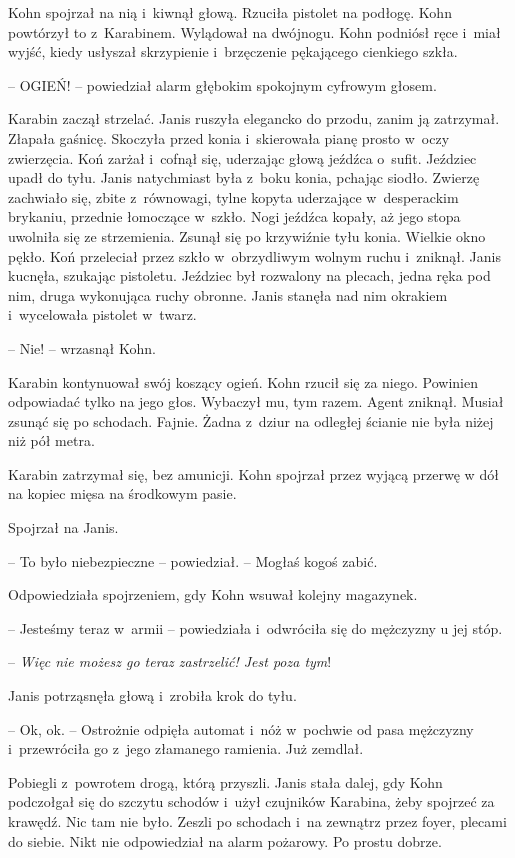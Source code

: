 \documentclass[oneside,polish,11pt,sfheadings]{mwbk}
\begin{document}
Kohn spojrzał na nią i~kiwnął głową. Rzuciła pistolet na podłogę. Kohn
powtórzył to z~Karabinem. Wylądował na dwójnogu. Kohn podniósł ręce i~miał wyjść, kiedy usłyszał skrzypienie i~brzęczenie pękającego cienkiego
szkła.

-- OGIEŃ! -- powiedział alarm głębokim spokojnym cyfrowym głosem.

Karabin zaczął strzelać. Janis ruszyła elegancko do przodu, zanim ją
zatrzymał. Złapała gaśnicę. Skoczyła przed konia i~skierowała pianę
prosto w~oczy zwierzęcia. Koń zarżał i~cofnął się, uderzając głową
jeźdźca o~sufit. Jeździec upadł do tyłu. Janis natychmiast była z~boku
konia, pchając siodło. Zwierzę zachwiało się, zbite z~równowagi, tylne
kopyta uderzające w~desperackim brykaniu, przednie łomoczące w~szkło.
Nogi jeźdźca kopały, aż jego stopa uwolniła się ze strzemienia. Zsunął
się po krzywiźnie tyłu konia. Wielkie okno pękło. Koń przeleciał przez
szkło w~obrzydliwym wolnym ruchu i~zniknął. Janis kucnęła, szukając
pistoletu. Jeździec był rozwalony na plecach, jedna ręka pod nim, druga
wykonująca ruchy obronne. Janis stanęła nad nim okrakiem i~wycelowała
pistolet w~twarz.

-- Nie! -- wrzasnął Kohn.

Karabin kontynuował swój koszący ogień. Kohn rzucił się za niego.
Powinien odpowiadać tylko na jego głos. Wybaczył mu, tym razem. Agent
zniknął. Musiał zsunąć się po schodach. Fajnie. Żadna z~dziur na
odległej ścianie nie była niżej niż pół metra.

Karabin zatrzymał się, bez amunicji. Kohn spojrzał przez wyjącą przerwę
w dół na kopiec mięsa na środkowym pasie.

Spojrzał na Janis.

-- To było niebezpieczne -- powiedział. -- Mogłaś kogoś zabić.

Odpowiedziała spojrzeniem, gdy Kohn wsuwał kolejny magazynek.

-- Jesteśmy teraz w~armii -- powiedziała i~odwróciła się do mężczyzny u
jej stóp.

-- \emph{Więc nie możesz go teraz zastrzelić! Jest poza tym}!

Janis potrząsnęła głową i~zrobiła krok do tyłu. 

-- Ok, ok. -- Ostrożnie
odpięła automat i~nóż w~pochwie od pasa mężczyzny i~przewróciła go z~jego złamanego ramienia. Już zemdlał.

Pobiegli z~powrotem drogą, którą przyszli. Janis stała dalej, gdy Kohn
podczołgał się do szczytu schodów i~użył czujników Karabina, żeby
spojrzeć za krawędź. Nic tam nie było. Zeszli po schodach i~na zewnątrz
przez foyer, plecami do siebie. Nikt nie odpowiedział na alarm pożarowy.
Po prostu dobrze.
\end{document}
